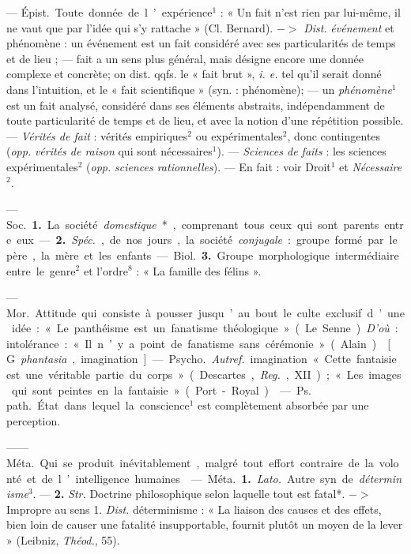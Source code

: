 \begin{itemize}[leftmargin=1cm, label=, itemsep=1pt]
 — \si{Épist.} Toute donnée de l’expérience$^1$ : « Un fait n'est
rien par lui-même, il ne vaut que par l’idée qui s’y rattache » (Cl. Bernard).
$->$ {\it Dist.} {\it événement} et phénomène : un événement est un fait 
considéré avec ses particularités de temps et de lieu ; — fait a un sens
plus général, mais désigne encore une donnée complexe et concrète; on dist. 
qqfs. le « fait brut », {\it i. e.} tel qu'il serait donné dans l'intuition,
et le « fait scientifique » (syn. : phénomène); — un {\it phénomène}$^1$ est
un fait analysé, considéré dans ses éléments abstraits, indépendamment de
toute particularité de temps et de lieu, et avec la notion d’une
répétition possible. — {\it Vérités de fait} : vérités empiriques$^2$ ou
expérimentales$^2$, donc contingentes ({\it opp.}
{\it vérités de raison} qui sont nécessaires$^1$). — {\it Sciences de faits} :
les sciences expérimentales$^2$ ({\it opp.}
{\it sciences rationnelles}). — En fait : voir Droit$^1$ et
{\it Nécessaire}$^2$.

 — \si{Soc.} {\bf 1.} La société {\it domestique}*, comprenant
tous ceux qui sont parents entre eux. — {\bf 2.} {\it Spéc.}, de nos jours,
la société {\it conjugale} : groupe formé par le père, la mère et les enfants.

— \si{Biol.} {\bf 3.} Groupe morphologique intermédiaire entre le genre$^2$
et l’ordre$^8$ : « La famille des félins ».

 — \si{Mor.} Attitude qui consiste à pousser jusqu’au bout le
culte exclusif d’une idée : « Le panthéisme est un fanatisme
théologique » (Le Senne). {\it D'où} : intolérance :
« Il n’y a point de fanatisme sans cérémonie » (Alain).

 [G. {\it phantasia}, imagination].
— \si{Psycho.} {\it Autref.} imagination « Cette fantaisie est une véritable
partie du corps » (Descartes, {\it Reg.}, XII); « Les images qui sont peintes
en la fantaisie » (Port-Royal).

 — \si{Ps. path.} État dans
lequel la conscience$^1$ est complètement absorbée par une perception.

 —— \si{Méta.} Qui se produit inévitablement, malgré tout effort contraire de la volonté et de l’intelligence humaines.

 — \si{Méta.} {\bf 1.} {\it Lato.} Autre.
syn. de {\it déterminisme}$^3$. — {\bf 2.} {\it Str.}
 Doctrine philosophique selon laquelle tout est fatal*.
$->$ Impropre au sens 1. {\it Dist.} déterminisme : « La
liaison des causes et des effets, bien
loin de causer une fatalité insupportable, fournit plutôt un moyen de
la lever » (Leibniz, {\it Théod.}, 55).


\end{itemize}
